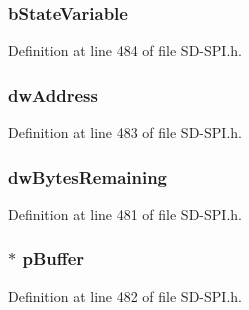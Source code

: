 \subsubsection[{b\+State\+Variable}]{ b\+State\+Variable}\label{struct_a_s_y_n_c___i_o_ac55ebddf89ed4c02fd8d64362b4acd5c}


Definition at line 484 of file S\+D-\/\+S\+P\+I.\+h.

\hypertarget{struct_a_s_y_n_c___i_o_afbbec435d6d7895aa7ed48ba5f5a6ff0}{}
\subsubsection[{dw\+Address}]{ dw\+Address}\label{struct_a_s_y_n_c___i_o_afbbec435d6d7895aa7ed48ba5f5a6ff0}


Definition at line 483 of file S\+D-\/\+S\+P\+I.\+h.

\hypertarget{struct_a_s_y_n_c___i_o_acc2d44adcb63a5043c9bda3e648abb00}{}
\subsubsection[{dw\+Bytes\+Remaining}]{ dw\+Bytes\+Remaining}\label{struct_a_s_y_n_c___i_o_acc2d44adcb63a5043c9bda3e648abb00}


Definition at line 481 of file S\+D-\/\+S\+P\+I.\+h.

\hypertarget{struct_a_s_y_n_c___i_o_a81bba27029571d8801e39f24898ddaa0}{}
\subsubsection[{p\+Buffer}]{$\ast$ p\+Buffer}\label{struct_a_s_y_n_c___i_o_a81bba27029571d8801e39f24898ddaa0}


Definition at line 482 of file S\+D-\/\+S\+P\+I.\+h.

